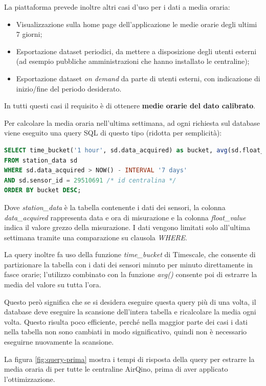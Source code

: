 La piattaforma prevede inoltre altri casi d’uso per i dati a media oraria:
\begin{itemize}
  \item Visualizzazione sulla home page dell’applicazione le medie orarie degli ultimi 7 giorni;
  \item Esportazione dataset periodici, da mettere a disposizione degli utenti esterni (ad esempio pubbliche amministrazioni che hanno installato le centraline);
  \item Esportazione dataset \textit{on demand} da parte di utenti esterni, con indicazione di inizio/fine del periodo desiderato.
\end{itemize}
In tutti questi casi il requisito è di ottenere \textbf{medie orarie del dato calibrato}.

Per calcolare la media oraria nell'ultima settimana, ad ogni richiesta sul database viene eseguito una query SQL di questo tipo (ridotta per semplicità):

\vspace{1mm}
\begin{lstlisting}[language=sql]
SELECT time_bucket('1 hour', sd.data_acquired) as bucket, avg(sd.float_value)
FROM station_data sd
WHERE sd.data_acquired > NOW() - INTERVAL '7 days'
AND sd.sensor_id = 29510691 /* id centralina */
ORDER BY bucket DESC;
\end{lstlisting}

Dove \textit{station\_data} è la tabella contenente i dati dei sensori, la colonna \textit{data\_acquired} rappresenta data e ora di misurazione e la colonna \textit{float\_value} indica il valore grezzo della misurazione.
I dati vengono limitati solo all'ultima settimana tramite una comparazione su clausola \textit{WHERE}.

La query inoltre fa uso della funzione \textit{time\_bucket} di Timescale, che consente di partizionare la tabella con i dati dei sensori minuto per minuto direttamente in fasce orarie; l'utilizzo combinato con la funzione \textit{avg()} consente poi di estrarre la media del valore su tutta l'ora.

Questo però significa che se si desidera eseguire questa query più di una volta, il database deve eseguire la scansione dell'intera tabella e ricalcolare la media ogni volta. Questo risulta poco efficiente, perché nella maggior parte dei casi i dati nella tabella non sono cambiati in modo significativo, quindi non è necessario eseguirne nuovamente la scansione.

La figura \ref{fig:query-prima} mostra i tempi di risposta della query per estrarre la media oraria di  per tutte le centraline AirQino, prima di aver applicato l'ottimizzazione.

